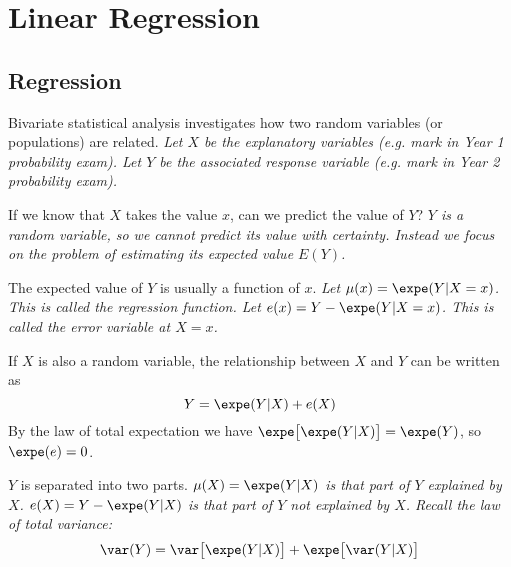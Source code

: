 \chapter{Linear Regression}\label{chap:regression}
\setcounter{page}{1}
\startcontents[chapters]
\chapcontents

\section{Regression}
Bivariate statistical analysis investigates how two random variables (or populations) are related.
\bit
\it Let $X$ be the \emph{explanatory} variables (e.g. mark in Year 1 probability exam).
\it Let $Y$ be the associated \emph{response} variable (e.g. mark in Year 2 probability exam).
\eit

\vspace*{2ex}
If we know that $X$ takes the value $x$, can we predict the value of $Y$?
\bit
\it $Y$ is a random variable, so we cannot predict its value with certainty.
\it Instead we focus on the problem of estimating its expected value $E(Y)$.
\eit

\vspace*{2ex}
The expected value of $Y$ is usually a function of $x$.
\bit
\it Let $\mu(x) = \expe(Y|X=x)$. This is called the \emph{regression function}.
\it Let $e(x) = Y - \expe(Y|X=x)$. This is called the \emph{error variable} at $X=x$.
\eit

%
\vspace*{1ex}
If $X$ is also a random variable, the relationship between $X$ and $Y$ can be written as
\[
Y = \expe(Y|X) + e(X)
\]
By the law of total expectation we have $\expe\big[\expe(Y|X)\big] = \expe(Y)$, so $\expe(e)=0$.



%
$Y$ is separated into two parts.
\bit
\it $\mu(X)=\expe(Y|X)$ is that part of $Y$ \emph{explained} by $X$.
\it $e(X)=Y-\expe(Y|X)$ is that part of $Y$ \emph{not explained} by $X$. 
\eit
Recall the law of total variance:
\[
\var(Y) = \var\big[\expe(Y|X)\big] + \expe\big[\var(Y|X)\big]
\]

